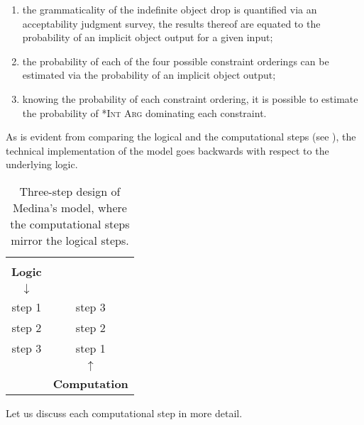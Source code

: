 \begin{enumerate}
    \item the grammaticality of the indefinite object drop is quantified via an acceptability judgment survey, the results thereof are equated to the probability of an implicit object output for a given input;
    \item the probability of each of the four possible constraint orderings can be estimated via the probability of an implicit object output;
    \item knowing the probability of each constraint ordering, it is possible to estimate the probability of \textsc{*Int Arg} dominating each constraint.
\end{enumerate}

As is evident from comparing the logical and the computational steps (see ), the technical implementation of the model goes backwards with respect to the underlying logic.

\begin{table}[htb] %
\caption{Three-step design of Medina's model, where the computational steps mirror the logical steps.}
\begin{tabular}{c c}
 & \\
\cmidrule{1-1} %
\textbf{Logic} &                      \\
\textbf{$\downarrow$} &                      \\ \hline
step 1         & step 3               \\
step 2         & step 2               \\
step 3         & step 1               \\ \hline
               & \textbf{$\uparrow$} \\
               & \textbf{Computation} \\
\cmidrule{2-2}           
\end{tabular}
\end{table}

Let us discuss each computational step in more detail.

